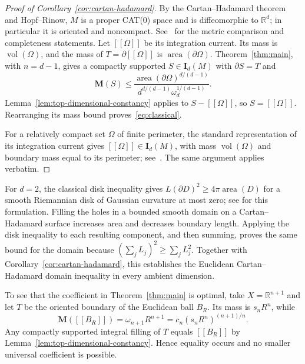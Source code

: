 \documentclass[11pt]{article}
\numberwithin{equation}{section}
\theoremstyle{definition}
\theoremstyle{remark}
\begin{document}
\begin{proof}[Proof of Corollary~\ref{cor:cartan-hadamard}]
By the Cartan--Hadamard theorem and Hopf--Rinow, $M$ is a proper
CAT(0) space and is diffeomorphic to $\mathbb R^d$; in particular it is
oriented and noncompact. See~\cite[Sections~I.3, II.1A and II.4]{BridsonHaefliger1999}
for the metric comparison and completeness statements.
Let $[[\Omega]]$ be its integration
current. Its mass is $\operatorname{vol}(\Omega)$, and the mass of
$T=\partial[[\Omega]]$ is $\operatorname{area}(\partial\Omega)$.
Theorem~\ref{thm:main}, with $n=d-1$, gives a compactly supported
$S\in\mathbf I_d(M)$ with $\partial S=T$ and
\[
 \mathbf M(S)\le
 \frac{\operatorname{area}(\partial\Omega)^{d/(d-1)}}
 {d^{d/(d-1)}\omega_d^{1/(d-1)}}.
\]
Lemma~\ref{lem:top-dimensional-constancy} applies to
$S-[[\Omega]]$, so $S=[[\Omega]]$. Rearranging its mass bound
proves~\eqref{eq:classical}.

For a relatively compact set $\Omega$ of finite perimeter, the
standard representation of its integration current gives
$[[\Omega]]\in\mathbf I_d(M)$, with mass $\operatorname{vol}(\Omega)$ and boundary
mass equal to its perimeter; see~\cite[Chapter~3, Section~4, Theorem~4.3;
Chapter~6, Section~3, Remark~3.15]{Simon2014}. The same
argument applies verbatim.
\end{proof}

For $d=2$, the classical disk inequality gives
$L(\partial D)^2\ge4\pi\operatorname{area}(D)$ for a smooth
Riemannian disk of Gaussian curvature at most zero; see
\cite[Section~1.2, Theorem~3]{Izmestiev2014} for this formulation.
Filling the holes in a bounded smooth domain on a Cartan--Hadamard
surface increases area and decreases boundary length. Applying the disk
inequality to each resulting component, and then summing, proves the
same bound for the domain because $(\sum_j L_j)^2\ge\sum_jL_j^2$.
Together with Corollary~\ref{cor:cartan-hadamard}, this establishes the
Euclidean Cartan--Hadamard domain inequality in every ambient dimension.

To see that the coefficient in Theorem~\ref{thm:main} is optimal,
take $X=\mathbb R^{n+1}$ and let $T$ be the oriented boundary of the
Euclidean ball $B_R$. Its mass is $s_nR^n$, while
\[
 \mathbf M([[B_R]])=\omega_{n+1}R^{n+1}
 =c_n(s_nR^n)^{(n+1)/n}.
\]
Any compactly supported integral filling of $T$ equals $[[B_R]]$
by Lemma~\ref{lem:top-dimensional-constancy}. Hence equality occurs
and no smaller universal coefficient is possible.

\begingroup
\small

\setlength{\labelsep}{1em}


\endgroup
\end{document}
